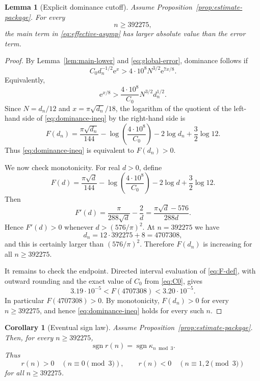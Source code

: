 \documentclass[11pt]{article}
\newtheorem{lemma}[theorem]{Lemma}
\newtheorem{corollary}[theorem]{Corollary}
\theoremstyle{remark}
\newcommand{\e}{\mathrm e}
\begin{document}
\begin{lemma}[Explicit dominance cutoff]\label{lem:cutoff}
Assume Proposition~\ref{prop:estimate-package}.  For every
\[
n\geq392275,
\]
the main term in \eqref{eq:effective-asymp} has larger absolute value than
the error term.
\end{lemma}

\begin{proof}
By Lemma~\ref{lem:main-lower} and \eqref{eq:global-error}, dominance follows if
\[
C_0d_n^{-1/2}\e^x
>
4\cdot10^8N^{3/2}\e^{7x/8}.
\]
Equivalently,
\begin{equation}\label{eq:dominance-ineq}
\e^{x/8}>
\frac{4\cdot10^8}{C_0}N^{3/2}d_n^{1/2}.
\end{equation}
Since $N=d_n/12$ and $x=\pi\sqrt{d_n}/18$, the logarithm of the quotient of
the left-hand side of \eqref{eq:dominance-ineq} by the right-hand side is
\begin{equation}\label{eq:F-def}
F(d_n)
=
\frac{\pi\sqrt{d_n}}{144}
-
\log\left(\frac{4\cdot10^8}{C_0}\right)
-2\log d_n
+\frac32\log 12.
\end{equation}
Thus \eqref{eq:dominance-ineq} is equivalent to $F(d_n)>0$.

We now check monotonicity.  For real $d>0$, define
\[
F(d)=
\frac{\pi\sqrt d}{144}
-
\log\left(\frac{4\cdot10^8}{C_0}\right)
-2\log d
+\frac32\log 12.
\]
Then
\[
F'(d)=\frac{\pi}{288\sqrt d}-\frac2d
=\frac{\pi\sqrt d-576}{288d}.
\]
Hence $F'(d)>0$ whenever $d>(576/\pi)^2$.  At $n=392275$ we have
\[
d_n=12\cdot392275+8=4707308,
\]
and this is certainly larger than $(576/\pi)^2$.  Therefore $F(d_n)$ is
increasing for all $n\geq392275$.

It remains to check the endpoint.  Directed interval evaluation of
\eqref{eq:F-def}, with outward rounding and the exact value of $C_0$ from
\eqref{eq:C0}, gives
\[
3.19\cdot10^{-5}
<
F(4707308)
<
3.20\cdot10^{-5}.
\]
In particular $F(4707308)>0$.  By monotonicity, $F(d_n)>0$ for every
$n\geq392275$, and hence \eqref{eq:dominance-ineq} holds for every such $n$.
\end{proof}

\begin{corollary}[Eventual sign law]\label{cor:eventual-sign}
Assume Proposition~\ref{prop:estimate-package}.  Then, for every
$n\geq392275$,
\[
\operatorname{sgn}r(n)=\operatorname{sgn}\kappa_{n\bmod3}.
\]
Thus
\[
r(n)>0\quad(n\equiv0\pmod3),
\qquad
r(n)<0\quad(n\equiv1,2\pmod3)
\]
for all $n\geq392275$.
\end{corollary}
\end{document}
